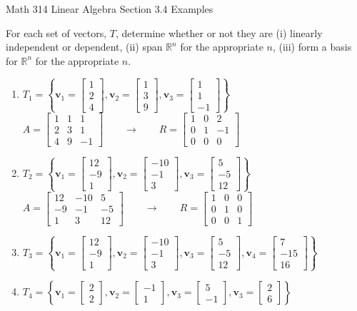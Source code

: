 \documentclass[12pt]{amsart}
\def\vectwo#1#2{\begin{bmatrix}#1\\#2\end{bmatrix}}
\def\vecthree#1#2#3{\begin{bmatrix}#1\\#2\\#3\end{bmatrix}}
\begin{document}
\scriptsize \noindent Math 314 Linear Algebra \hfill Section 3.4 Examples 
\normalsize\medskip


\thispagestyle{empty}
For each set of vectors, $T$, determine whether or not they are (i) linearly independent or dependent, (ii) span $\mathbb{R}^n$ for the appropriate $n$, (iii) form a basis for $\mathbb{R}^n$ for the appropriate $n$.

\begin{enumerate}
\item $T_1=\left\{ \mathbf{v}_1= \vecthree{1}{2}{4},\mathbf{v}_2= \vecthree{1}{3}{9},\mathbf{v}_3= \vecthree{1}{1}{-1} \right\}$\\

\medskip
\noindent  $A = \begin{bmatrix} 1 & 1 & 1 \\ 2 & 3 & 1 \\ 4 & 9 & -1 \end{bmatrix} \qquad \to \qquad R = \begin{bmatrix} 1 & 0 & 2 \\ 0 & 1 & -1 \\ 0 & 0 & 0 \end{bmatrix}$
\vfill

\item $T_2=\left\{ \mathbf{v}_1= \vecthree{12}{-9}{1},\mathbf{v}_2= \vecthree{-10}{-1}{3},\mathbf{v}_3= \vecthree{5}{-5}{12} \right\}$\\

\medskip
\noindent  $A = \begin{bmatrix} 12 & -10 & 5 \\ -9 & -1 & -5 \\ 1 & 3 & 12 \end{bmatrix} \qquad \to \qquad R = \begin{bmatrix} 1 & 0 & 0 \\ 0 & 1 & 0 \\ 0 & 0 & 1 \end{bmatrix}$
\vfill
\item $T_3=\left\{ \mathbf{v}_1= \vecthree{12}{-9}{1},\mathbf{v}_2= \vecthree{-10}{-1}{3},\mathbf{v}_3= \vecthree{5}{-5}{12}, \mathbf{v}_4= \vecthree{7}{-15}{16} \right\}$\\
\vfill


\newpage

\item $T_4=\left\{ \mathbf{v}_1= \vectwo{2}{2},\mathbf{v}_2= \vectwo{-1}{1},\mathbf{v}_3= \vectwo{5}{-1},\mathbf{v}_3=\vectwo{2}{6} \right\}$\\


\end{enumerate}
\end{document}

